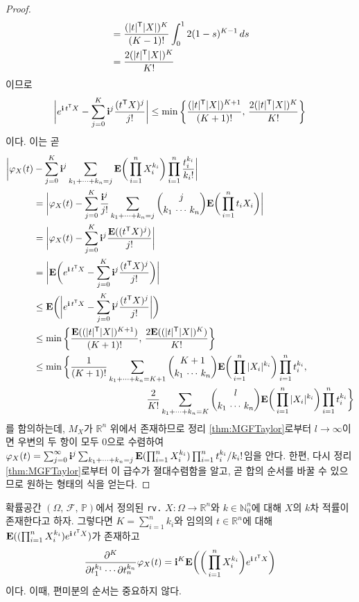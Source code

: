 \begin{proof}
\begin{align*}
        &=\frac{(|t|^{\mathsf{T}}|X|)^K}{(K-1)!}\int_0^12(1-s)^{K-1}\,ds\\
        &=\frac{2(|t|^{\mathsf{T}}|X|)^K}{K!}
    \end{align*}
    이므로
    \begin{equation*}
        \bigg|e^{\mathbf{i}\,t^{\mathsf{T}} X}-\sum_{j=0}^K\mathbf{i}^j\frac{(t^{\mathsf{T}} X)^j}{j!}\bigg|\leq\min\bigg\{\frac{(|t|^{\mathsf{T}}|X|)^{K+1}}{(K+1)!},\,\frac{2(|t|^{\mathsf{T}}|X|)^K}{K!}\bigg\}
    \end{equation*}
    이다. 이는 곧
    \begin{align*}
        \bigg|\varphi_X(t)&-\sum_{j=0}^K\mathbf{i}^j\sum_{k_1+\cdots+k_n=j}\mathbf{E}\bigg(\prod_{i=1}^nX_i^{k_i}\bigg)\prod_{i=1}^n\frac{t_i^{k_i}}{k_i!}\bigg|\\
        &=\bigg|\varphi_X(t)-\sum_{j=0}^K\frac{\mathbf{i}^j}{j!}\sum_{k_1+\cdots+k_n=j}\binom{j}{k_1\,\cdots\,k_n}\mathbf{E}\bigg(\prod_{i=1}^nt_iX_i\bigg)\bigg|\\
        &=\bigg|\varphi_X(t)-\sum_{j=0}^K\mathbf{i}^j\frac{\mathbf{E}((t^{\mathsf{T}} X)^j)}{j!}\bigg|\\
        &=\bigg|\mathbf{E}\bigg(e^{\mathbf{i}\,t^{\mathsf{T}} X}-\sum_{j=0}^K\mathbf{i}^j\frac{(t^{\mathsf{T}} X)^j}{j!}\bigg)\bigg|\\
        &\leq\mathbf{E}\bigg(\bigg|e^{\mathbf{i}\,t^{\mathsf{T}} X}-\sum_{j=0}^K\mathbf{i}^j\frac{(t^{\mathsf{T}} X)^j}{j!}\bigg|\bigg)\\
        &\leq\min\bigg\{\frac{\mathbf{E}((|t|^{\mathsf{T}}|X|)^{K+1})}{(K+1)!},\,\frac{2\mathbf{E}((|t|^{\mathsf{T}}|X|)^K)}{K!}\bigg\}\\
        &\leq\min\bigg\{\frac{1}{(K+1)!}\sum_{k_1+\cdots+k_n=K+1}\binom{K+1}{k_1\,\cdots\,k_n}\mathbf{E}\bigg(\prod_{i=1}^n|X_i|^{k_i}\bigg)\prod_{i=1}^nt_i^{k_i},\\
        &\qquad\qquad\qquad\qquad\qquad\qquad\frac{2}{K!}\sum_{k_1+\cdots+k_n=K}\binom{l}{k_1\,\cdots\,k_n}\mathbf{E}\bigg(\prod_{i=1}^n|X_i|^{k_i}\bigg)\prod_{i=1}^nt_i^{k_i}\bigg\}
    \end{align*}
    를 함의하는데, $M_X$가 $\mathbb{R}^n$ 위에서 존재하므로 정리 \ref{thm:MGFTaylor}로부터 $l\to\infty$이면 우변의 두 항이 모두 $0$으로 수렴하여 $\varphi_X(t)=\sum_{j=0}^\infty\mathbf{i}^j\sum_{k_1+\cdots+k_n=j}\mathbf{E}(\prod_{i=1}^nX_i^{k_i})\prod_{i=1}^nt_i^{k_i}/k_i!$임을 안다. 한편, 다시 정리 \ref{thm:MGFTaylor}로부터 이 급수가 졀대수렴함을 알고, 곧 합의 순서를 바꿀 수 있으므로 원하는 형태의 식을 얻는다.
\end{proof}

\begin{theorem}
    확률공간 $(\Omega,\,\mathcal{F},\,\mathbb{P})$에서 정의된 \texttt{rv.} $X:\Omega\to\mathbb{R}^n$와 $k\in\mathbb{N}_0^n$에 대해 $X$의 $k$차 적률이 존재한다고 하자. 그렇다면 $K=\sum_{i=1}^nk_i$와 임의의 $t\in\mathbb{R}^n$에 대해 $\mathbf{E}((\prod_{i=1}^nX_i^{k_i})e^{\mathbf{i}\,t^{\mathsf{T}} X})$가 존재하고
    \begin{equation*}
        \frac{\partial^K}{\partial t_1^{k_1}\cdots\partial t_n^{k_n}}\varphi_X(t)=\mathbf{i}^K\mathbf{E}\bigg(\bigg(\prod_{i=1}^nX_i^{k_i}\bigg)e^{\mathbf{i}\,t^{\mathsf{T}} X}\bigg)
    \end{equation*}
    이다. 이때, 편미분의 순서는 중요하지 않다.
\end{theorem}

